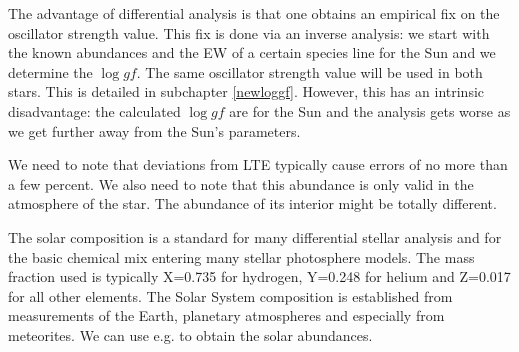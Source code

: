 \documentclass[dvips,12pt,a4paper]{report}
\begin{document}
{The advantage of differential analysis is that one obtains an empirical fix on the oscillator strength value. This fix is done via an inverse analysis: we start with the known abundances and the EW of a certain species line for the Sun and we determine the $\log gf$. The same oscillator strength value will be used in both stars. This is detailed in subchapter \ref{newloggf}. However, this has an intrinsic disadvantage: the calculated $\log gf$ are for the Sun and the analysis gets worse as we get further away from the Sun's parameters. 

We need to note that deviations from LTE typically cause errors of no more than a few percent. We also need to note that this abundance is only valid in the atmosphere of the star. The abundance of its interior might be totally different.

The solar composition is a standard for many differential stellar analysis and for the basic chemical mix entering many stellar photosphere models. The mass fraction used is typically X=0.735 for hydrogen, Y=0.248 for helium and Z=0.017 for all other elements. The Solar System composition is established from measurements of the Earth, planetary atmospheres and especially from meteorites. We can use e.g. \citet{Anders-1989} to obtain the solar abundances.





}
\end{document}

